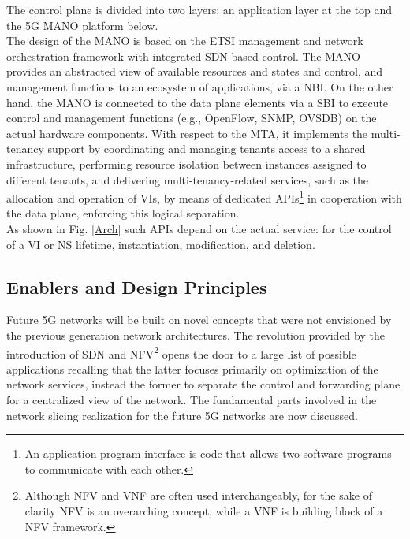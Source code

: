 \documentclass[a4paper,12pt]{report} %
\begin{document}
The control plane is divided into two layers: an application layer at the top and the 5G \gls{MANO} platform below. \\
The design of the MANO is based on the ETSI management and network orchestration framework with integrated SDN-based control. The MANO
provides an abstracted view of available resources and states and control, and
management functions to an ecosystem of applications, via a \gls{NBI}. On the other hand, the MANO is connected to the data plane
elements via a \gls{SBI} to execute control and management
functions (e.g., OpenFlow, SNMP, OVSDB) on the actual hardware components.
With respect to the \gls{MTA}, it implements the
multi-tenancy support by coordinating and managing tenants access to a shared
infrastructure, performing resource isolation between instances assigned to
different tenants, and delivering multi-tenancy-related services, such as the
allocation and operation of VIs, by means of dedicated \gls{API}s\footnote{An application program interface is code that allows two software programs to communicate with each other.} in cooperation
with the data plane, enforcing this logical separation. \\
As shown in Fig. \ref{Arch}
such APIs depend on the actual service: for the control of a VI or NS lifetime,
instantiation, modification, and deletion.

\subsection{Enablers and Design Principles}
Future 5G networks will be built on novel concepts that were not envisioned by the previous generation
network architectures. The revolution provided by the introduction of SDN
and \gls{NFV}\footnote{Although NFV and VNF are often used interchangeably, for the sake of clarity NFV is an overarching concept, while a VNF is building block of a NFV framework.} opens the door to a
large list of possible applications recalling that the latter focuses primarily on optimization of the network services, instead the former to separate the control and forwarding plane for a centralized view of the network. The fundamental parts involved in the network slicing realization for the future 5G networks are now discussed.
\end{document}

